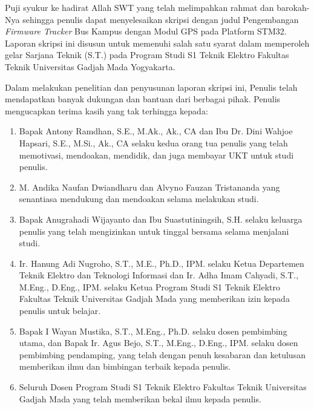 Puji syukur ke hadirat Allah SWT yang telah melimpahkan rahmat dan barokah-Nya sehingga penulis dapat menyelesaikan skripsi dengan judul Pengembangan \textit{Firmware Tracker} Bus Kampus dengan Modul GPS pada Platform STM32. Laporan skripsi ini disusun untuk memenuhi salah satu syarat dalam memperoleh gelar Sarjana Teknik (S.T.) pada Program Studi S1 Teknik Elektro Fakultas Teknik Universitas Gadjah Mada Yogyakarta.


Dalam melakukan penelitian dan penyusunan laporan skripsi ini, Penulis telah mendapatkan banyak dukungan dan bantuan dari berbagai pihak. Penulis mengucapkan terima kasih yang tak terhingga kepada:

\begin{enumerate}
	\item Bapak Antony Ramdhan, S.E., M.Ak., Ak., CA dan Ibu Dr. Dini Wahjoe Hapsari, S.E., M.Si., Ak., CA selaku kedua orang tua penulis yang telah memotivasi, mendoakan, mendidik, dan juga membayar UKT untuk studi penulis.
	
	\item M. Andika Naufan Dwiandharu dan Alvyno Fauzan Tristananda yang senantiasa mendukung dan mendoakan selama melakukan studi.
	
	\item Bapak Anugrahadi Wijayanto dan Ibu Suastutiningsih, S.H. selaku keluarga penulis  yang telah mengizinkan untuk tinggal bersama selama menjalani studi.
	
	
	\item Ir. Hanung Adi Nugroho, S.T., M.E., Ph.D., IPM. selaku Ketua Departemen Teknik Elektro dan Teknologi Informasi dan Ir. Adha Imam Cahyadi, S.T., M.Eng., D.Eng., IPM. selaku Ketua Program Studi S1 Teknik Elektro Fakultas Teknik Universitas Gadjah Mada yang memberikan izin kepada penulis untuk belajar.
		
	\item Bapak I Wayan Mustika, S.T., M.Eng., Ph.D. selaku dosen pembimbing utama, dan Bapak Ir. Agus Bejo, S.T., M.Eng., D.Eng., IPM. selaku dosen pembimbing pendamping, yang telah dengan penuh kesabaran dan ketulusan memberikan ilmu dan bimbingan terbaik kepada penulis.
	
	\item Seluruh Dosen Program Studi S1 Teknik Elektro Fakultas Teknik Universitas Gadjah Mada yang telah memberikan bekal ilmu kepada penulis.
	

\end{enumerate}

